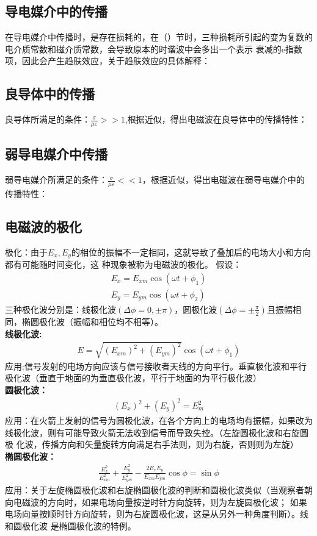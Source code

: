 \documentclass[UTF8]{article}
\begin{document}
\subsection{导电媒介中的传播}
在导电媒介中传播时，是存在损耗的，在（）节时，三种损耗所引起的变为复数的电介质常数和磁介质常数，会导致原本的时谐波中会多出一个表示
衰减的e指数项，因此会产生趋肤效应，关于趋肤效应的具体解释：
\subsection{良导体中的传播}
良导体所满足的条件：$\frac{\sigma}{\mu \varepsilon}>>1$,根据近似，得出电磁波在良导体中的传播特性：

\subsection{弱导电媒介中传播}
弱导电媒介所满足的条件：$\frac{\sigma}{\mu \varepsilon}<<1$，根据近似，得出电磁波在弱导电媒介中的传播特性：

\subsection{电磁波的极化}
极化：由于$E_x,E_y$的相位的振幅不一定相同，这就导致了叠加后的电场大小和方向都有可能随时间变化，这
种现象被称为电磁波的极化。
假设：
\begin{align}
    E_x = E_{xm} \cos(\omega t +\phi_1)\\
    E_y = E_{ym} \cos(\omega t +\phi_2)
\end{align}
三种极化波分别是：线极化波$(\Delta \phi =0, \pm \pi)$，圆极化波$(\Delta \phi = \pm\frac{\pi}{2})$且振幅相同，椭圆极化波（振幅和相位均不相等）。\\
\textbf{线极化波:}
\begin{align}
    E = \sqrt{(E_{xm})^2+(E_{ym})^2}\cos (\omega t+\phi_1)
\end{align}
应用:信号发射的电场方向应该与信号接收者天线的方向平行。垂直极化波和平行
极化波（垂直于地面的为垂直极化波，平行于地面的为平行极化波）\\
\textbf{圆极化波：}
\begin{align}
    (E_x)^2+(E_y)^2=E_m^2
\end{align}
应用：在火箭上发射的信号为圆极化波，在各个方向上的电场均有振幅，如果改为
线极化波，则有可能导致火箭无法收到信号而导致失控。（左旋圆极化波和右旋圆极
化波，传播方向和矢量旋转方向满足右手法则，则为右旋，否则则为左旋）\\
\textbf{椭圆极化波：}
\begin{align}
    \frac{E_x^2}{E_{xm}^2}+\frac{E_y^2}{E_{ym}^2}-\frac{2E_xE_y}{E_{xm}E_{ym}}
    \cos \phi =\sin \phi
\end{align}
应用：关于左旋椭圆极化波和右旋椭圆极化波的判断和圆极化波类似（当观察者朝向电磁波的方向时，如果电场向量按逆时针方向旋转，则为左旋圆极化波；
如果电场向量按顺时针方向旋转，则为右旋圆极化波，这是从另外一种角度判断）。线和圆极化波
是椭圆极化波的特例。
\end{document}
